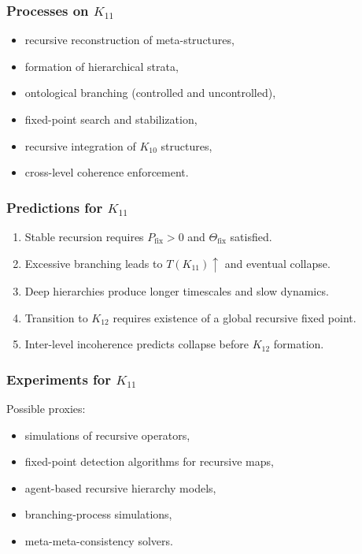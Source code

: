 \subsubsection{Processes on $K_{11}$}

\begin{itemize}
    \item recursive reconstruction of meta-structures,
    \item formation of hierarchical strata,
    \item ontological branching (controlled and uncontrolled),
    \item fixed-point search and stabilization,
    \item recursive integration of $K_{10}$ structures,
    \item cross-level coherence enforcement.
\end{itemize}

\subsubsection{Predictions for $K_{11}$}

\begin{enumerate}
    \item Stable recursion requires $P_{\mathrm{fix}}>0$ and $\Theta_{\mathrm{fix}}$ satisfied.
    \item Excessive branching leads to $T(K_{11})\uparrow$ and eventual collapse.
    \item Deep hierarchies produce longer timescales and slow dynamics.
    \item Transition to $K_{12}$ requires existence of a global recursive fixed point.
    \item Inter-level incoherence predicts collapse before $K_{12}$ formation.
\end{enumerate}

\subsubsection{Experiments for $K_{11}$}

Possible proxies:
\begin{itemize}
    \item simulations of recursive operators,
    \item fixed-point detection algorithms for recursive maps,
    \item agent-based recursive hierarchy models,
    \item branching-process simulations,
    \item meta-meta-consistency solvers.
\end{itemize}

